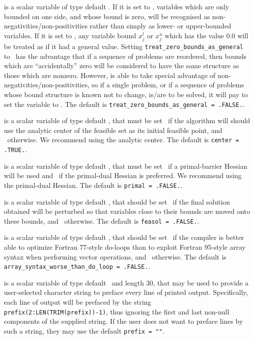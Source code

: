\begin{description}
 is a scalar variable of type 
default \logical.
If it is set to \false, variables which 
are only bounded on one side, and whose bound is zero,
will be recognised as non-negativities/non-positivities rather than simply as
lower- or upper-bounded variables.
If it is set to \true, any variable bound 
$x_{j}^{l}$ or $x_{j}^{u}$ which has the value 0.0 will be
treated as if it had a general value.
Setting {\tt treat\_zero\_bounds\_as\_general} to \true\ has the advantage
that if a sequence of problems are reordered, then bounds which are
``accidentally'' zero will be considered to have the same structure as
those which are nonzero. However, {\tt \fullpackagename} is
able to take special advantage of non-negativities/non-positivities, so
if a single problem, or if a sequence of problems whose 
bound structure is known not to change, is/are to be solved, 
it will pay to set the variable to \false.
The default is {\tt treat\_zero\_bounds\_as\_general = .FALSE.}.

 is a scalar variable of type default \logical, that 
must be set \true\
if the algorithm will should use the analytic center
of the feasible set as its initial feasible point, 
and \false\ otherwise. 
We recommend using the analytic center.
The default is {\tt center = .TRUE.}.

 is a scalar variable of type default \logical, that 
must be set \true\
if a primal-barrier Hessian will be used
and \false\ if the primal-dual Hessian is preferred.
We recommend using the primal-dual Hessian.
The default is {\tt primal = .FALSE.}.

 is a scalar variable of type default \logical, that 
should be set \true\ 
if the final solution obtained will be perturbed 
so that variables close to their bounds are moved onto these bounds,
and \false\ otherwise. 
The default is {\tt feasol = .FALSE.}.

 is a scalar variable of type 
default \logical, that should be set \true\ if the compiler is
better able to optimize Fortran 77-style do-loops than to exploit 
Fortran 95-style array syntax when performing vector operations,
and \false\ otherwise. 
The default is {\tt array\_syntax\_worse\_than\_do\_loop = .FALSE.}.

\itt{prefix} is a scalar variable of type default \character\
and length 30, that may be used to provide a user-selected 
character string to preface every line of printed output. 
Specifically, each line of output will be prefaced by the string 
{\tt prefix(2:LEN(TRIM(prefix))-1)},
thus ignoring the first and last non-null components of the
supplied string. If the user does not want to preface lines by such
a string, they may use the default {\tt prefix = ""}.


\end{description}
